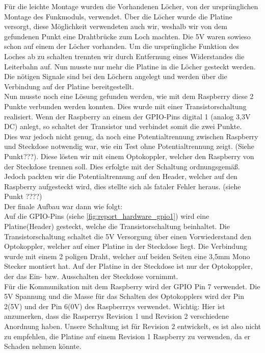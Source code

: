 Für die leichte Montage wurden die Vorhandenen Löcher, von der ursprünglichen Montage des Funkmoduls, verwendet. Über die Löcher wurde die Platine versorgt, diese Möglichkeit verwendeten auch wir, weshalb wir von dem gefundenen Punkt eine Drahtbrücke zum Loch machten. Die 5V waren sowieso schon auf einem der Löcher vorhanden. Um die ursprüngliche Funktion des Loches ab zu schalten trennten wir durch Entfernung eines Widerstandes die Leiterbahn auf. Nun musste nur mehr die Platine in die Löcher gesteckt werden. Die nötigen Signale sind bei den Löchern angelegt und werden über die Verbindung auf der Platine bereitgestellt.\\
Nun musste noch eine Lösung gefunden werden, wie mit dem Raspberry diese 2 Punkte verbunden werden konnten. Dies wurde mit einer Transistorschaltung realisiert. Wenn der Raspberry an einem der GPIO-Pins digital 1 (analog 3,3V DC) anlegt, so schaltet der Transistor und verbindet somit die zwei Punkte. \\
Dies war jedoch nicht genug, da noch eine Potentialtrennung zwischen Raspberry und Steckdose  notwendig war, wie ein Test ohne Potentialtrennung zeigt. (Siehe Punkt???). Diese lösten wir mit einem Optokoppler, welcher den Raspberry von der Steckdose trennen soll. Dies erfolgte mit der Schaltung ordnungsgemäß. Jedoch packten wir die Potentialtrennung auf den Header, welcher auf den Raspberry aufgesteckt wird, dies stellte sich als fataler Fehler heraus. (siehe Punkt ????)\\
Der finale Aufbau war dann wie folgt:\\
Auf die GPIO-Pins (siehe \autoref{fig:report_hardware_gpio1}) wird eine Platine(Header) gesteckt, welche die Transistorschaltung beinhaltet. Die Transistorschaltung schaltet die 5V Versorgung über einen Vorwiederstand den Optokoppler, welcher auf einer Platine in der Steckdose liegt. Die Verbindung wurde mit einem 2 poligen Draht, welcher auf beiden Seiten eine 3,5mm Mono Stecker montiert hat. Auf der Platine in der Steckdose ist nur der Optokoppler, der das Ein- bzw. Ausschalten der Steckdose vornimmt.\\
Für die Kommunikation mit dem Raspberry wird der GPIO Pin 7 verwendet. Die 5V Spannung und die Masse für das Schalten des Optokopplers wird der Pin 2(5V) und der Pin 6(0V) des Raspberrrys verwendet. Wichtig: Hier ist anzumerken, dass die Rasperrys Revision 1 und Revision 2 verschiedene Anordnung haben. Unsere Schaltung ist für Revision 2 entwickelt, es ist also nicht zu empfehlen, die Platine auf einem Revision 1 Raspberry zu verwenden, da er Schaden nehmen könnte.
